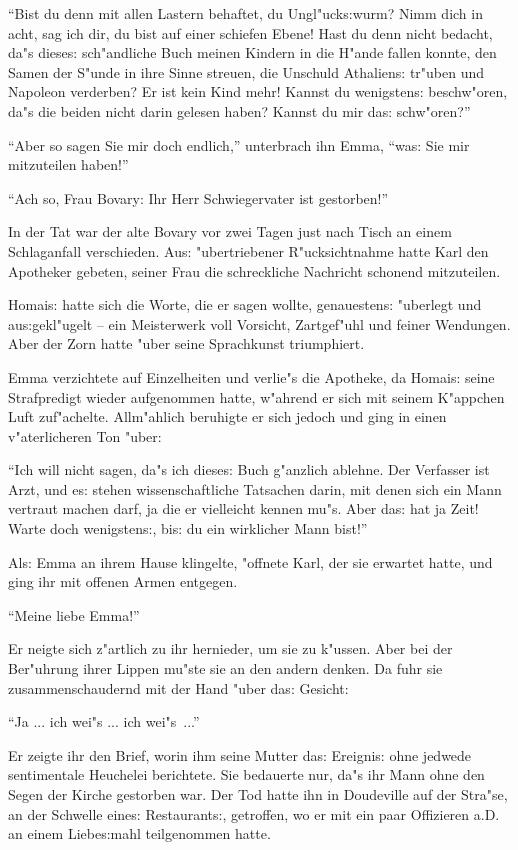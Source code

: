 \documentclass[oneside,12pt]{book}
\newcommand{\s}{s:}%
\begin{document}
"`Bist du denn mit allen Lastern behaftet, du Ungl"uck{\s}wurm?
Nimm dich in acht, sag ich dir, du bist auf einer schiefen Ebene!
Hast du denn nicht bedacht, da"s diese{\s} sch"andliche Buch
meinen Kindern in die H"ande fallen konnte, den Samen der S"unde
in ihre Sinne streuen, die Unschuld Athalien{\s} tr"uben und
Napoleon verderben? Er ist kein Kind mehr! Kannst du wenigsten{\s}
beschw"oren, da"s die beiden nicht darin gelesen haben? Kannst du
mir da{\s} schw"oren?"'

"`Aber so sagen Sie mir doch endlich,"' unterbrach ihn Emma,
"`wa{\s} Sie mir mit\/zuteilen haben!"'

"`Ach so, Frau Bovary: Ihr Herr Schwiegervater ist gestorben!"'

In der Tat war der alte Bovary vor zwei Tagen just nach Tisch an
einem Schlaganfall verschieden. Au{\s} "ubertriebener
R"ucksichtnahme hatte Karl den Apotheker gebeten, seiner Frau die
schreckliche Nachricht schonend mit\/zuteilen.

Homai{\s} hatte sich die Worte, die er sagen wollte, genauesten{\s}
"uberlegt und au{\s}gekl"ugelt -- ein Meisterwerk voll Vorsicht,
Zartgef"uhl und feiner Wendungen. Aber der Zorn hatte "uber seine
Sprachkunst triumphiert.

Emma verzichtete auf Einzelheiten und verlie"s die Apotheke, da
Homai{\s} seine Strafpredigt wieder aufgenommen hatte, w"ahrend er
sich mit seinem K"appchen Luft zuf"achelte. Allm"ahlich beruhigte
er sich jedoch und ging in einen v"aterlicheren Ton "uber:

"`Ich will nicht sagen, da"s ich diese{\s} Buch g"anzlich ablehne.
Der Verfasser ist Arzt, und e{\s} stehen wissenschaftliche
Tatsachen darin, mit denen sich ein Mann vertraut machen darf, ja
die er vielleicht kennen mu"s. Aber da{\s} hat ja Zeit! Warte doch
wenigsten{\s}, bi{\s} du ein wirklicher Mann bist!"'

Al{\s} Emma an ihrem Hause klingelte, "offnete Karl, der sie
erwartet hatte, und ging ihr mit offenen Armen entgegen.

"`Meine liebe Emma!"'

Er neigte sich z"artlich zu ihr hernieder, um sie zu k"ussen. Aber
bei der Ber"uhrung ihrer Lippen mu"ste sie an den andern denken.
Da fuhr sie zusammenschaudernd mit der Hand "uber da{\s} Gesicht:

"`Ja ... ich wei"s ... ich wei"s~..."'

Er zeigte ihr den Brief, worin ihm seine Mutter da{\s} Ereigni{\s}
ohne jedwede sentimentale Heuchelei berichtete. Sie bedauerte nur,
da"s ihr Mann ohne den Segen der Kirche gestorben war. Der Tod
hatte ihn in Doudeville auf der Stra"se, an der Schwelle eine{\s}
Restaurant{\s}, getroffen, wo er mit ein paar Offizieren a.D. an
einem Liebe{\s}mahl teilgenommen hatte.
\end{document}
